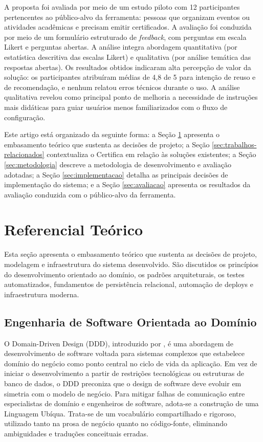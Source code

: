 \documentclass[article,a4paper,12pt,brazil,sumario=tradicional]{abntex2}
\begin{document}
A proposta foi avaliada por meio de um estudo piloto com 12 participantes pertencentes ao público-alvo da ferramenta: pessoas que organizam eventos ou atividades acadêmicas e precisam emitir certificados. A avaliação foi conduzida por meio de um formulário estruturado de \textit{feedback}, com perguntas em escala Likert e perguntas abertas. A análise integra abordagem quantitativa (por estatística descritiva das escalas Likert) e qualitativa (por análise temática das respostas abertas). Os resultados obtidos indicaram alta percepção de valor da solução: os participantes atribuíram médias de 4,8 de 5 para intenção de reuso e de recomendação, e nenhum relatou erros técnicos durante o uso. A análise qualitativa revelou como principal ponto de melhoria a necessidade de instruções mais didáticas para guiar usuários menos familiarizados com o fluxo de configuração.

Este artigo está organizado da seguinte forma: a Seção \ref{sec:ref-teorico} apresenta o embasamento teórico que sustenta as decisões de projeto; a Seção \ref{sec:trabalhos-relacionados} contextualiza o Certifica em relação às soluções existentes; a Seção \ref{sec:metodologia} descreve a metodologia de desenvolvimento e avaliação adotadas; a Seção \ref{sec:implementacao} detalha as principais decisões de implementação do sistema; e a Seção \ref{sec:avaliacao} apresenta os resultados da avaliação conduzida com o público-alvo da ferramenta.


\section{Referencial Teórico}\label{sec:ref-teorico}

Esta seção apresenta o embasamento teórico que sustenta as decisões de projeto, modelagem e infraestrutura do sistema desenvolvido. São discutidos os princípios do desenvolvimento orientado ao domínio, os padrões arquiteturais, os testes automatizados, fundamentos de persistência relacional, automação de deploys e infraestrutura moderna.

\subsection{Engenharia de Software Orientada ao Domínio}

O Domain-Driven Design (DDD), introduzido por , é uma abordagem de desenvolvimento de software voltada para sistemas complexos que estabelece domínio do negócio como ponto central no ciclo de vida da aplicação. Em vez de iniciar o desenvolvimento a partir de restrições tecnológicas ou estruturas de banco de dados, o DDD preconiza que o design de software deve evoluir em simetria com o modelo de negócio. Para mitigar falhas de comunicação entre especialistas de domínio e engenheiros de software, adota-se a construção de uma Linguagem Ubíqua. Trata-se de um vocabulário compartilhado e rigoroso, utilizado tanto na prosa de negócio quanto no código-fonte, eliminando ambiguidades e traduções conceituais erradas.
\end{document}
